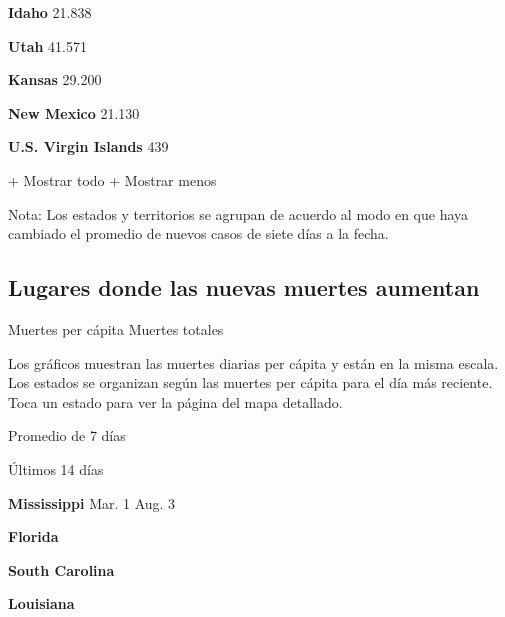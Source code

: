 \textbf{Idaho} 21.838

\href{https://www.nytimes3xbfgragh.onion/interactive/2020/us/utah-coronavirus-cases.html}{}

\textbf{Utah} 41.571

\href{https://www.nytimes3xbfgragh.onion/interactive/2020/us/kansas-coronavirus-cases.html}{}

\textbf{Kansas} 29.200

\href{https://www.nytimes3xbfgragh.onion/interactive/2020/us/new-mexico-coronavirus-cases.html}{}

\textbf{New Mexico} 21.130

\textbf{U.S. Virgin Islands} 439

+ Mostrar todo + Mostrar menos

Nota: Los estados y territorios se agrupan de acuerdo al modo en que
haya cambiado el promedio de nuevos casos de siete días a la fecha.

\hypertarget{lugares-donde-las-nuevas-muertes-aumentan}{%
\subsection{Lugares donde las nuevas muertes
aumentan}\label{lugares-donde-las-nuevas-muertes-aumentan}}

Muertes per cápita Muertes totales

Los gráficos muestran las muertes diarias per cápita y están en la misma
escala. Los estados se organizan según las muertes per cápita para el
día más reciente. Toca un estado para ver la página del mapa detallado.

\href{https://www.nytimes3xbfgragh.onion/interactive/2020/us/mississippi-coronavirus-cases.html}{}

Promedio de 7 días

Últimos 14 días

\textbf{Mississippi} Mar. 1 Aug. 3

\href{https://www.nytimes3xbfgragh.onion/interactive/2020/us/florida-coronavirus-cases.html}{}

\textbf{Florida}

\href{https://www.nytimes3xbfgragh.onion/interactive/2020/us/south-carolina-coronavirus-cases.html}{}

\textbf{South Carolina}

\href{https://www.nytimes3xbfgragh.onion/interactive/2020/us/louisiana-coronavirus-cases.html}{}

\textbf{Louisiana}


